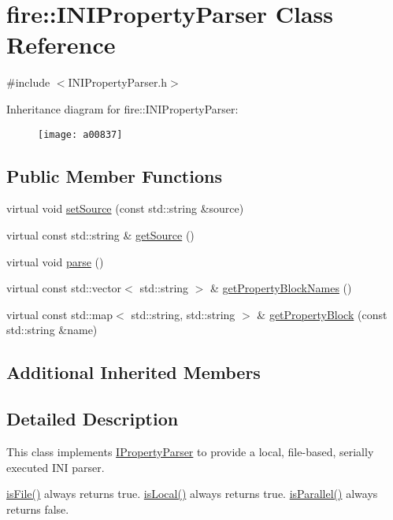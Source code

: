 \hypertarget{a00837}{}\section{fire\+:\+:I\+N\+I\+Property\+Parser Class Reference}
\label{a00837}


{\ttfamily \#include $<$I\+N\+I\+Property\+Parser.\+h$>$}

Inheritance diagram for fire\+:\+:I\+N\+I\+Property\+Parser\+:\begin{figure}[H]
\begin{center}
\leavevmode
\texttt{[image: a00837]}
\end{center}
\end{figure}
\subsection*{Public Member Functions}
\begin{DoxyCompactItemize}
\item 
virtual void \hyperlink{a00837_a06793909bc707a69d0c5772b14bc946d}{set\+Source} (const std\+::string \&source)
\item 
virtual const std\+::string \& \hyperlink{a00837_ad02c9a530f20a706d7bb2554813e8d3a}{get\+Source} ()
\item 
virtual void \hyperlink{a00837_a31b6bad01e65ed4bb5f1ba297616c641}{parse} ()
\item 
virtual const std\+::vector$<$ std\+::string $>$ \& \hyperlink{a00837_aed0f1f47111794659564dcddb4d25bc6}{get\+Property\+Block\+Names} ()
\item 
virtual const std\+::map$<$ std\+::string, std\+::string $>$ \& \hyperlink{a00837_a3591312590a66659ebd377cdde9ab9ad}{get\+Property\+Block} (const std\+::string \&name)
\end{DoxyCompactItemize}
\subsection*{Additional Inherited Members}


\subsection{Detailed Description}
This class implements \hyperlink{a00845}{I\+Property\+Parser} to provide a local, file-\/based, serially executed I\+NI parser.

\hyperlink{a00833_a091d5cf56bf8f407854ef87f460b2958}{is\+File()} always returns true. \hyperlink{a00833_a770acae6e216de3a9c7140a12de25d58}{is\+Local()} always returns true. \hyperlink{a00833_ad46898c516adcce38acbb4800dc9777b}{is\+Parallel()} always returns false.

